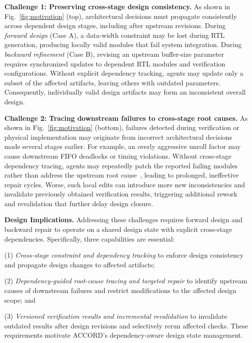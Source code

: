 \documentclass[9pt,conference]{IEEEtran}
\begin{document}
\textbf{Challenge 1: Preserving cross-stage design consistency.}
As shown in Fig.~\ref{fig:motivation} (top), architectural decisions must propagate consistently across dependent design stages, including after upstream revisions. During \emph{forward design} (Case A), a data-width constraint may be lost during RTL generation, producing locally valid modules that fail system integration. During \emph{backward refinement} (Case B), revising an upstream buffer-size parameter requires synchronized updates to dependent RTL modules and verification configurations. Without explicit dependency tracking, agents may update only a subset of the affected artifacts, leaving others with outdated parameters. Consequently, individually valid design artifacts may form an inconsistent overall design.

\textbf{Challenge 2: Tracing downstream failures to cross-stage root causes.}
As shown in Fig.~\ref{fig:motivation} (bottom), failures detected during verification or physical implementation may originate from incorrect architectural decisions made several stages earlier. For example, an overly aggressive unroll factor may cause downstream FIFO deadlocks or timing violations. Without cross-stage dependency tracing, agents may repeatedly patch the reported failing modules rather than address the upstream root cause~\cite{swesearch}, leading to prolonged, ineffective repair cycles. Worse, such local edits can introduce more new inconsistencies and invalidate previously obtained verification results, triggering additional rework and revalidation that further delay design closure.

\textbf{Design Implications.}
Addressing these challenges requires forward design and backward repair to operate on a shared design state with explicit cross-stage dependencies. Specifically, three capabilities are essential:

(1) \emph{Cross-stage constraint and dependency tracking} to enforce design consistency and propagate design changes to affected artifacts;

(2) \emph{Dependency-guided root-cause tracing and targeted repair} to identify upstream causes of downstream failures and restrict modifications to the affected design scope; and

(3) \emph{Versioned verification results and incremental revalidation} to invalidate outdated results after design revisions and selectively rerun affected checks.
These requirements motivate ACCORD's dependency-aware design state management.
\end{document}
